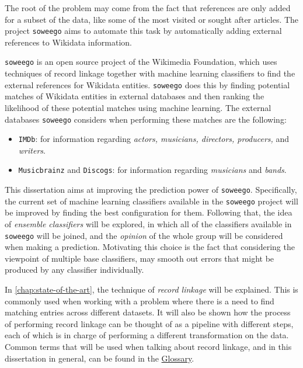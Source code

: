 \documentclass[epsfig,a4paper,11pt,titlepage,twoside,openany]{book}
\newcommand{\soweego}[0]{\texttt{soweego}\xspace}
\begin{document}
The root of the problem may come from the fact that references are only added for a subset of the data, like some of the most visited or sought after articles. The project \soweego aims to automate this task by automatically adding external references to Wikidata information. 

\soweego is an open source project of the Wikimedia Foundation, which uses techniques of record linkage together with machine learning classifiers to find the external references for Wikidata entities. \soweego does this by finding potential matches of Wikidata entities in external databases and then ranking the likelihood of these potential matches using machine learning. The external databases \soweego considers when performing these matches are the following:

\begin{itemize}
    \item \texttt{IMDb}: for information regarding \textit{actors, musicians, directors, producers,} and \textit{writers}.
    \item \texttt{Musicbrainz} and \texttt{Discogs}: for information regarding \textit{musicians} and \textit{bands}.
\end{itemize}

This dissertation aims at improving the prediction power of \soweego. Specifically, the current set of machine learning classifiers available in the \soweego project will be improved by finding the best configuration for them. Following that, the idea of \textit{ensemble classifiers} will be explored, in which all of the classifiers available in \soweego will be joined, and the \textit{opinion} of the whole group will be considered when making a prediction. Motivating this choice is the fact that considering the viewpoint of multiple base classifiers, may smooth out errors that might be produced by any classifier individually. 

In \autoref{chap:state-of-the-art}, the technique of \textit{record linkage} will be explained. This is commonly used when working with a problem where there is a need to find matching entries across different datasets. It will also be shown how the process of performing record linkage can be thought of as a pipeline with different steps, each of which is in charge of performing a different transformation on the data. Common terms that will be used when talking about record linkage, and in this dissertation in general, can be found in the \hyperref[sec:apx-glossary]{Glossary}.
\end{document}
